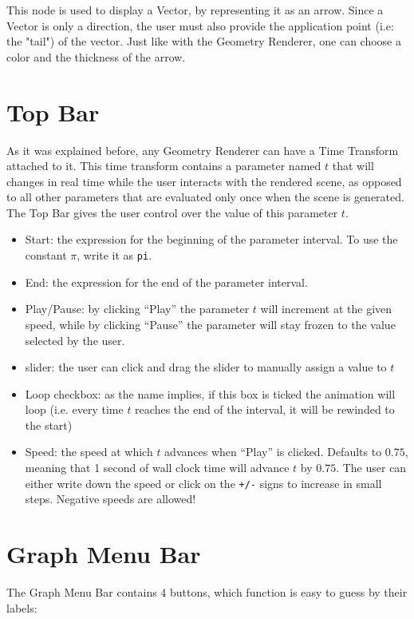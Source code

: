 This node is used to display a Vector, by representing it as an arrow.
Since a Vector is only a direction, the user must also provide the application point (i.e: the "tail") of the vector.
Just like with the Geometry Renderer, one can choose a color and the thickness of the arrow.

\section{Top Bar}

As it was explained before, any Geometry Renderer can have a Time Transform attached to it.
This time transform contains a parameter named $t$ that will changes in real time while the
user interacts with the rendered scene, as opposed to all other parameters that are evaluated
only once when the scene is generated.
The Top Bar gives the user control over the value of this parameter $t$.

\begin{itemize}
    \item Start: the expression for the beginning of the parameter interval. To use
        the constant $\pi$, write it as \texttt{pi}.
    \item End: the expression for the end of the parameter interval.
    \item Play/Pause: by clicking ``Play'' the parameter $t$ will increment at the given speed,
        while by clicking ``Pause'' the parameter will stay frozen to the value selected by the user.
    \item slider: the user can click and drag the slider to manually assign a value to $t$
    \item Loop checkbox: as the name implies, if this box is ticked the animation will loop
        (i.e. every time $t$ reaches the end of the interval, it will be rewinded to the start)
    \item Speed: the speed at which $t$ advances when ``Play'' is clicked. Defaults to $0.75$,
        meaning that 1 second of wall clock time will advance $t$ by $0.75$. The user can either
        write down the speed or click on the \texttt{+/-} signs to increase in small steps.
        Negative speeds are allowed!
\end{itemize}


\section{Graph Menu Bar}

The Graph Menu Bar contains 4 buttons, which function is easy to guess by their labels:

